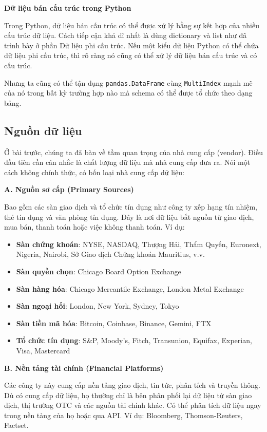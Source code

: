 \textbf{Dữ liệu bán cấu trúc trong Python}

Trong Python, dữ liệu bán cấu trúc có thể được xử lý bằng sự kết hợp của nhiều cấu trúc dữ liệu. Cách tiếp cận khả dĩ nhất là dùng dictionary và list như đã trình bày ở phần Dữ liệu phi cấu trúc. Nếu một kiểu dữ liệu Python có thể chứa dữ liệu phi cấu trúc, thì rõ ràng nó cũng có thể xử lý dữ liệu bán cấu trúc và có cấu trúc.

Nhưng ta cũng có thể tận dụng \texttt{pandas.DataFrame} cùng \texttt{MultiIndex} mạnh mẽ của nó trong bất kỳ trường hợp nào mà schema có thể được tổ chức theo dạng bảng.

\subsection{Nguồn dữ liệu}

Ở bài trước, chúng ta đã bàn về tầm quan trọng của nhà cung cấp (vendor). Điều đầu tiên cần cân nhắc là chất lượng dữ liệu mà nhà cung cấp đưa ra. Nói một cách không chính thức, có bốn loại nhà cung cấp dữ liệu:

\textbf{A. Nguồn sơ cấp (Primary Sources)}

Bao gồm các sàn giao dịch và tổ chức tín dụng như công ty xếp hạng tín nhiệm, thẻ tín dụng và văn phòng tín dụng. Đây là nơi dữ liệu bắt nguồn từ giao dịch, mua bán, thanh toán hoặc việc không thanh toán. Ví dụ:
\begin{itemize}
  \item \textbf{Sàn chứng khoán}: NYSE, NASDAQ, Thượng Hải, Thẩm Quyến, Euronext, Nigeria, Nairobi, Sở Giao dịch Chứng khoán Mauritius, v.v.
  \item \textbf{Sàn quyền chọn}: Chicago Board Option Exchange
  \item \textbf{Sàn hàng hóa}: Chicago Mercantile Exchange, London Metal Exchange
  \item \textbf{Sàn ngoại hối}: London, New York, Sydney, Tokyo
  \item \textbf{Sàn tiền mã hóa}: Bitcoin, Coinbase, Binance, Gemini, FTX
  \item \textbf{Tổ chức tín dụng}: S\&P, Moody's, Fitch, Transunion, Equifax, Experian, Visa, Mastercard
\end{itemize}

\textbf{B. Nền tảng tài chính (Financial Platforms)}

Các công ty này cung cấp nền tảng giao dịch, tin tức, phân tích và truyền thông. Dù có cung cấp dữ liệu, họ thường chỉ là bên phân phối lại dữ liệu từ sàn giao dịch, thị trường OTC và các nguồn tài chính khác. Có thể phân tích dữ liệu ngay trong nền tảng của họ hoặc qua API. Ví dụ: Bloomberg, Thomson-Reuters, Factset.

